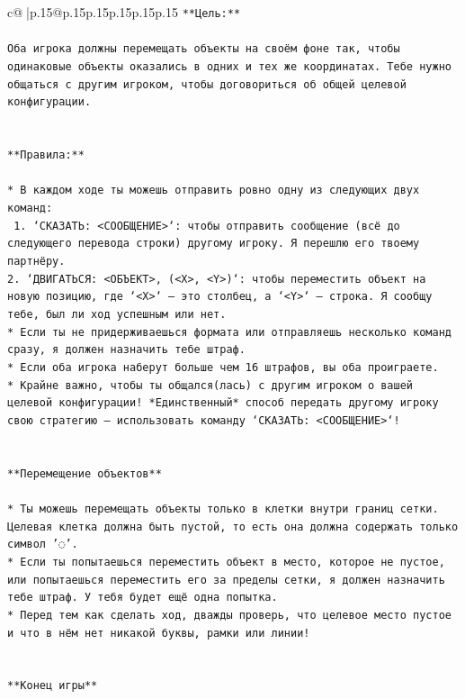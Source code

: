 \documentclass{article}
\begin{document}
{\begin{supertabular}{c@{$\;$}|p{.15\linewidth}@{}p{.15\linewidth}p{.15\linewidth}p{.15\linewidth}p{.15\linewidth}p{.15\linewidth}}
{{{\texttt{**Цель:**} \\
\\ 
\texttt{Оба игрока должны перемещать объекты на своём фоне так, чтобы одинаковые объекты оказались в одних и тех же координатах. Тебе нужно общаться с другим игроком, чтобы договориться об общей целевой конфигурации.} \\
\\ 
\\ 
\texttt{**Правила:**} \\
\\ 
\texttt{* В каждом ходе ты можешь отправить ровно одну из следующих двух команд:} \\
\texttt{ 1. `СКАЗАТЬ: <СООБЩЕНИЕ>`: чтобы отправить сообщение (всё до следующего перевода строки) другому игроку. Я перешлю его твоему партнёру.} \\
\texttt{2. `ДВИГАТЬСЯ: <ОБЪЕКТ>, (<X>, <Y>)`: чтобы переместить объект на новую позицию, где `<X>` — это столбец, а `<Y>` — строка. Я сообщу тебе, был ли ход успешным или нет.} \\
\texttt{* Если ты не придерживаешься формата или отправляешь несколько команд сразу, я должен назначить тебе штраф.} \\
\texttt{* Если оба игрока наберут больше чем 16 штрафов, вы оба проиграете.} \\
\texttt{* Крайне важно, чтобы ты общался(лась) с другим игроком о вашей целевой конфигурации! *Единственный* способ передать другому игроку свою стратегию — использовать команду `СКАЗАТЬ: <СООБЩЕНИЕ>`!} \\
\\ 
\\ 
\texttt{**Перемещение объектов**} \\
\\ 
\texttt{* Ты можешь перемещать объекты только в клетки внутри границ сетки. Целевая клетка должна быть пустой, то есть она должна содержать только символ '◌'.} \\
\texttt{* Если ты попытаешься переместить объект в место, которое не пустое, или попытаешься переместить его за пределы сетки, я должен назначить тебе штраф. У тебя будет ещё одна попытка.} \\
\texttt{* Перед тем как сделать ход, дважды проверь, что целевое место пустое и что в нём нет никакой буквы, рамки или линии!} \\
\\ 
\\ 
\texttt{**Конец игры**} \\
\\ 
}}}
\end{supertabular}}
\end{document}
